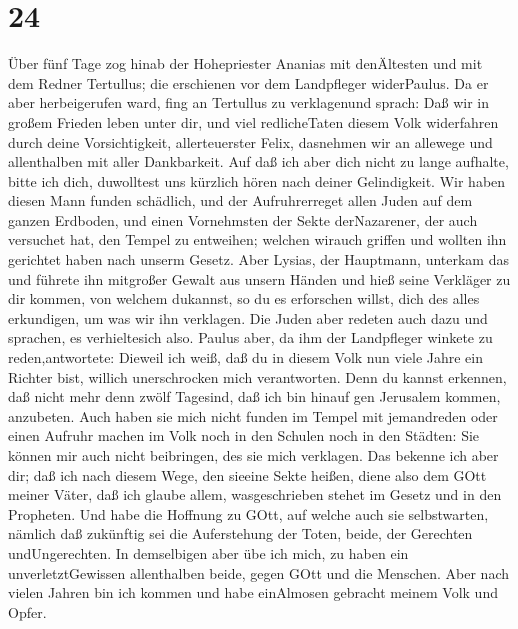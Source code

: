 \hypertarget{section-23}{%
\section{24}\label{section-23}}

 Über fünf Tage zog hinab der Hohepriester Ananias mit
denÄltesten und mit dem Redner Tertullus; die erschienen vor dem
Landpfleger widerPaulus.  Da er aber herbeigerufen ward,
fing an Tertullus zu verklagenund sprach:  Daß wir in großem
Frieden leben unter dir, und viel redlicheTaten diesem Volk widerfahren
durch deine Vorsichtigkeit, allerteuerster Felix, dasnehmen wir an
allewege und allenthalben mit aller Dankbarkeit.  Auf daß
ich aber dich nicht zu lange aufhalte, bitte ich dich, duwolltest uns
kürzlich hören nach deiner Gelindigkeit.  Wir haben diesen
Mann funden schädlich, und der Aufruhrerreget allen Juden auf dem ganzen
Erdboden, und einen Vornehmsten der Sekte derNazarener,  der
auch versuchet hat, den Tempel zu entweihen; welchen wirauch griffen und
wollten ihn gerichtet haben nach unserm Gesetz.  Aber
Lysias, der Hauptmann, unterkam das und führete ihn mitgroßer Gewalt aus
unsern Händen  und hieß seine Verkläger zu dir kommen, von
welchem dukannst, so du es erforschen willst, dich des alles erkundigen,
um was wir ihn verklagen.  Die Juden aber redeten auch dazu
und sprachen, es verhieltesich also.  Paulus aber, da ihm
der Landpfleger winkete zu reden,antwortete: Dieweil ich weiß, daß du in
diesem Volk nun viele Jahre ein Richter bist, willich unerschrocken mich
verantworten.  Denn du kannst erkennen, daß nicht mehr denn
zwölf Tagesind, daß ich bin hinauf gen Jerusalem kommen, anzubeten.
 Auch haben sie mich nicht funden im Tempel mit jemandreden
oder einen Aufruhr machen im Volk noch in den Schulen noch in den
Städten:  Sie können mir auch nicht beibringen, des sie
mich verklagen.  Das bekenne ich aber dir; daß ich nach
diesem Wege, den sieeine Sekte heißen, diene also dem GOtt meiner Väter,
daß ich glaube allem, wasgeschrieben stehet im Gesetz und in den
Propheten.  Und habe die Hoffnung zu GOtt, auf welche auch
sie selbstwarten, nämlich daß zukünftig sei die Auferstehung der Toten,
beide, der Gerechten undUngerechten.  In demselbigen aber
übe ich mich, zu haben ein unverletztGewissen allenthalben beide, gegen
GOtt und die Menschen.  Aber nach vielen Jahren bin ich
kommen und habe einAlmosen gebracht meinem Volk und Opfer. 

